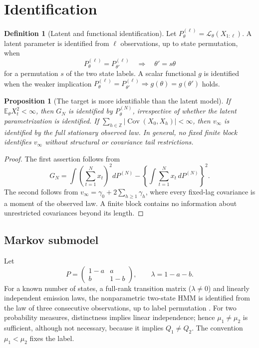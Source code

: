 \documentclass[11pt]{article}
\newtheorem{proposition}[theorem]{Proposition}
\theoremstyle{definition}
\newtheorem{definition}[theorem]{Definition}
\theoremstyle{remark}
\newcommand{\E}{\mathbb E}
\newcommand{\Cov}{\operatorname{Cov}}
\newcommand{\cL}{\mathcal L}
\begin{document}
\section{Identification}

\begin{definition}[Latent and functional identification]
Let $P_\theta^{(\ell)}=\cL_\theta(X_{1:\ell})$.  A latent parameter is
identified from $\ell$ observations, up to state permutation, when
\[
 P_\theta^{(\ell)}=P_{\theta'}^{(\ell)}
 \quad\Longrightarrow\quad
 \theta'=s\theta
\]
for a permutation $s$ of the two state labels.  A scalar functional $g$ is
identified when the weaker implication
$P_\theta^{(\ell)}=P_{\theta'}^{(\ell)}\Rightarrow
g(\theta)=g(\theta')$ holds.
\end{definition}

\begin{proposition}[The target is more identifiable than the latent model]
If $\E_\theta X_t^2<\infty$, then $G_N$ is identified by
$P_\theta^{(N)}$, irrespective of whether the latent parametrization is
identified.  If $\sum_{h\in\mathbb Z}|\Cov(X_0,X_h)|<\infty$, then
$v_\infty$ is identified by the full stationary observed law.  In general,
no fixed finite block identifies $v_\infty$ without structural or covariance
tail restrictions.
\end{proposition}

\begin{proof}
The first assertion follows from
\[
 G_N=\int\!\left(\sum_{t=1}^N x_t\right)^2dP^{(N)}
 -\left\{\int\!\sum_{t=1}^N x_t\,dP^{(N)}\right\}^2.
\]
The second follows from
$v_\infty=\gamma_0+2\sum_{h\ge1}\gamma_h$, where every fixed-lag
covariance is a moment of the observed law.  A finite block contains no
information about unrestricted covariances beyond its length.
\end{proof}

\subsection{Markov submodel}

Let
\[
 P=\begin{pmatrix}1-a&a\\ b&1-b\end{pmatrix},
 \qquad \lambda=1-a-b.
\]
For a known number of states, a full-rank transition matrix
($\lambda\ne0$) and linearly independent emission laws, the nonparametric
two-state HMM is identified from the law of three consecutive observations,
up to label permutation \cite{GassiatCleynenRobin2016}.  For two probability
measures, distinctness implies linear independence; hence $\mu_1\ne\mu_2$
is sufficient, although not necessary, because it implies $Q_1\ne Q_2$.
The convention $\mu_1<\mu_2$ fixes the label.
\end{document}
